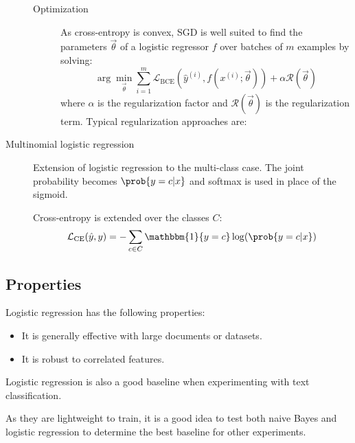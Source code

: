 \begin{description}
\begin{description}
            \item[Optimization]
                As cross-entropy is convex, SGD is well suited to find the parameters $\vec{\theta}$ of a logistic regressor $f$ over batches of $m$ examples by solving:
                \[ \arg\min_{\vec{\theta}} \sum_{i=1}^{m} \mathcal{L}_\text{BCE}(\hat{y}^{(i)}, f(x^{(i)}; \vec{\theta})) + \alpha \mathcal{R}(\vec{\theta}) \]
                where $\alpha$ is the regularization factor and $\mathcal{R}(\vec{\theta})$ is the regularization term. Typical regularization approaches are:
        \end{description}

    \item[Multinomial logistic regression] 
        Extension of logistic regression to the multi-class case. The joint probability becomes $\prob{y = c | x}$ and softmax is used in place of the sigmoid.

        Cross-entropy is extended over the classes $C$:
        \[ \mathcal{L}_\text{CE}(\hat{y}, y) = - \sum_{c \in C} \mathbbm{1}\{y = c\} \log(\prob{y = c | x}) \]
\end{description}


\subsection{Properties}

Logistic regression has the following properties:
\begin{itemize}
    \item It is generally effective with large documents or datasets.
    \item It is robust to correlated features.
\end{itemize}

\begin{remark}
    Logistic regression is also a good baseline when experimenting with text classification. 
    
    As they are lightweight to train, it is a good idea to test both naive Bayes and logistic regression to determine the best baseline for other experiments.
\end{remark}



